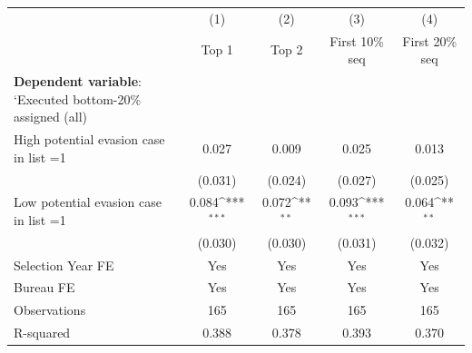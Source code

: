 {
\def\sym#1{\ifmmode^{#1}\else\(^{#1}\)\fi}
\begin{tabular}{l*{4}{c}}
\toprule
            &\multicolumn{1}{c}{(1)}&\multicolumn{1}{c}{(2)}&\multicolumn{1}{c}{(3)}&\multicolumn{1}{c}{(4)}\\
            &\multicolumn{1}{c}{Top 1}&\multicolumn{1}{c}{Top 2}&\multicolumn{1}{c}{First 10\% seq}&\multicolumn{1}{c}{First 20\% seq}\\
\midrule
\textbf{Dependent variable}: `Executed bottom-20\% \/ assigned (all)&                     &                     &                     &                     \\
\addlinespace
High potential evasion case in list =1&       0.027         &       0.009         &       0.025         &       0.013         \\
            &     (0.031)         &     (0.024)         &     (0.027)         &     (0.025)         \\
\addlinespace
Low potential evasion case in list =1&       0.084\sym{***}&       0.072\sym{**} &       0.093\sym{***}&       0.064\sym{**} \\
            &     (0.030)         &     (0.030)         &     (0.031)         &     (0.032)         \\
\midrule
Selection Year FE&         Yes         &         Yes         &         Yes         &         Yes         \\
Bureau FE   &         Yes         &         Yes         &         Yes         &         Yes         \\
Observations&         165         &         165         &         165         &         165         \\
R-squared   &       0.388         &       0.378         &       0.393         &       0.370         \\
\bottomrule
\end{tabular}
}
